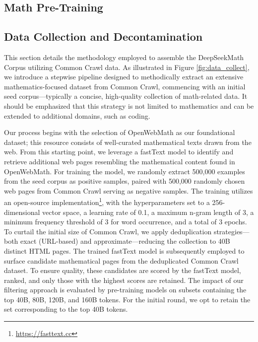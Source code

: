 \begin{itemize}[topsep=0pt]
\section{Math Pre-Training}

\subsection{Data Collection and Decontamination} This section details the methodology employed to assemble the DeepSeekMath Corpus utilizing Common Crawl data. As illustrated in Figure \ref{fig:data_collect}, we introduce a stepwise pipeline designed to methodically extract an extensive mathematics-focused dataset from Common Crawl, commencing with an initial seed corpus—typically a concise, high-quality collection of math-related data. It should be emphasized that this strategy is not limited to mathematics and can be extended to additional domains, such as coding.

Our process begins with the selection of OpenWebMath \citep{openwebmath} as our foundational dataset; this resource consists of well-curated mathematical texts drawn from the web. From this starting point, we leverage a fastText model \citep{joulin2016fasttext} to identify and retrieve additional web pages resembling the mathematical content found in OpenWebMath. For training the model, we randomly extract 500,000 examples from the seed corpus as positive samples, paired with 500,000 randomly chosen web pages from Common Crawl serving as negative samples. The training utilizes an open-source implementation\footnote{\url{https://fasttext.cc}}, with the hyperparameters set to a 256-dimensional vector space, a learning rate of 0.1, a maximum n-gram length of 3, a minimum frequency threshold of 3 for word occurrence, and a total of 3 epochs. To curtail the initial size of Common Crawl, we apply deduplication strategies—both exact (URL-based) and approximate—reducing the collection to 40B distinct HTML pages. The trained fastText model is subsequently employed to surface candidate mathematical pages from the deduplicated Common Crawl dataset. To ensure quality, these candidates are scored by the fastText model, ranked, and only those with the highest scores are retained. The impact of our filtering approach is evaluated by pre-training models on subsets containing the top 40B, 80B, 120B, and 160B tokens. For the initial round, we opt to retain the set corresponding to the top 40B tokens.


\end{itemize}
